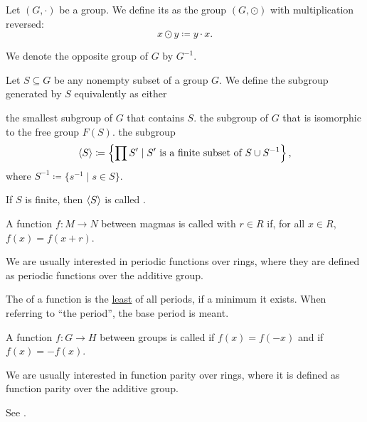 \begin{Definition}\label{def:opposite_group}
  Let \( (G, \cdot) \) be a group. We define its  as the group \( (G, \odot) \) with multiplication reversed:
  \begin{equation*}
    x \odot y \coloneqq y \cdot x.
  \end{equation*}

  We denote the opposite group of \( G \) by \( G^{-1} \).
\end{Definition}

\begin{Definition}\label{def:generated_subgroup}
  Let \( S \subseteq G \) be any nonempty subset of a group \( G \). We define the subgroup generated by \( S \) equivalently as either
  \begin{DefEnum}
     the smallest subgroup of \( G \) that contains \( S \).
     the subgroup of \( G \) that is isomorphic to the free group \( F(S) \).
     the subgroup
    \begin{equation*}
      \left\langle S \right\rangle \coloneqq \left\{ \prod S' \mid S' \text{ is a finite subset of } S \cup S^{-1} \right\},
    \end{equation*}
    where \( S^{-1} \coloneqq \{ s^{-1} \mid s \in S \} \).
  \end{DefEnum}

  If \( S \) is finite, then \( \left\langle S \right\rangle \) is called .
\end{Definition}

\begin{Definition}\label{def:periodic_function}
  A function \( f: M \to N \) between magmas is called  with  \( r \in R \) if, for all \( x \in R \), \( f(x) = f(x + r) \).

  We are usually interested in periodic functions over rings, where they are defined as periodic functions over the additive group.

  The  of a function is the \hyperref[def:preordered_set/largest_smallest_element]{least} of all periods, if a minimum it exists. When referring to \enquote{the period}, the base period is meant.
\end{Definition}

\begin{Definition}\label{def:function_pairity}
  A function \( f: G \to H \) between groups is called  if \( f(x) = f(-x) \) and  if \( f(x) = -f(x) \).

  We are usually interested in function parity over rings, where it is defined as function parity over the additive group.

  See .
\end{Definition}
